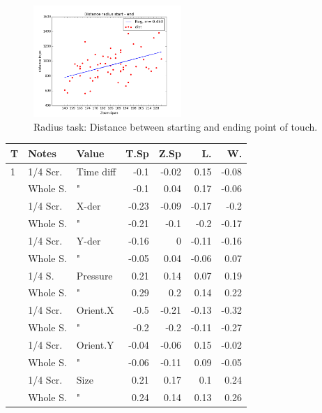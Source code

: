 \documentclass{sigchi}
\begin{document}
\begin{figure}[ht!]
	\centering
  \includegraphics[width=0.5\textwidth]{figures/plotRadiusStartEnd.png}
	\caption{Radius task: Distance between starting and ending point of touch.}
	\label{plotRadiusStartEnd}
\end{figure}


\begin{table}[ht]
    \begin{tabular}{|lll|rrrr|}
    \hline
    T 	& Notes       & Value     & T.Sp  & Z.Sp   & L. & W. \\ \hline
    1    & 1/4 Scr.  	& Time diff & -0.1  & -0.02  & 0.15   & -0.08 \\
    ~    & Whole S.   & "         & -0.1  & 0.04   & 0.17   & -0.06 \\
    ~    & 1/4 Scr.  	& X-der     & -0.23 & -0.09  & -0.17  & -0.2  \\
    ~    & Whole S.   & "         & -0.21 & -0.1   & -0.2   & -0.17 \\
    ~    & 1/4 Scr.  	&  Y-der    & -0.16 & 0      & -0.11  & -0.16 \\
    ~    & Whole S.   & "         & -0.05 & 0.04   & -0.06  & 0.07  \\
    ~    & 1/4 S.  		& Pressure  & 0.21  & 0.14   & 0.07   & 0.19  \\
    ~    & Whole S.   & "         & 0.29  & 0.2    & 0.14   & 0.22  \\
    ~    & 1/4 Scr.  	& Orient.X  & -0.5  & -0.21  & -0.13  & -0.32 \\
    ~    & Whole S.   & "         & -0.2  & -0.2   & -0.11  & -0.27 \\
    ~    & 1/4 Scr.  	& Orient.Y  & -0.04 & -0.06  & 0.15   & -0.02 \\
    ~    & Whole S.   & "         & -0.06 & -0.11  & 0.09   & -0.05 \\
    ~    & 1/4 Scr.  	& Size      & 0.21  & 0.17   & 0.1    & 0.24  \\
    ~    & Whole S.   & "         & 0.24  & 0.14   & 0.13   & 0.26  \\ \hline

\end{tabular}
\end{table}
\end{document}

